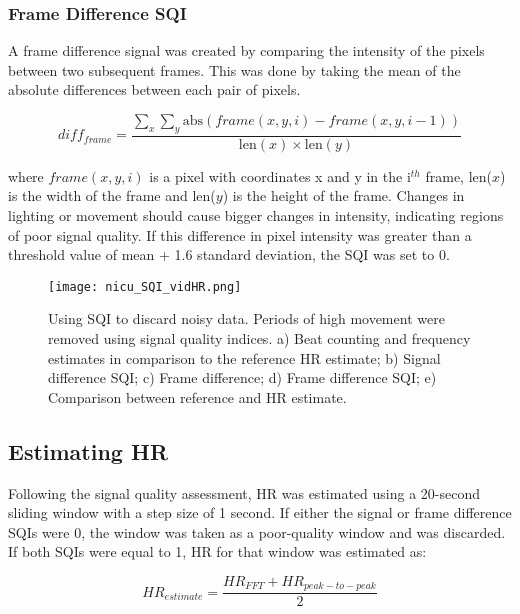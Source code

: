 \subsubsection{Frame Difference SQI}
A frame difference signal was created by comparing the intensity of the pixels between two subsequent frames. This was done by taking the mean of the absolute differences between each pair of pixels. 

\begin{equation}
	diff_{frame} =\dfrac{\sum_{x}^{}\sum_{y}^{}\textrm{abs}(frame(x,y,i) - frame(x,y,i - 1))}{\textrm{len}(x) \times \textrm{len}(y)} 
\end{equation}

where $frame(x,y,i)$ is a pixel with coordinates x and y in the i$^{th}$ frame, len($x$) is the width of the frame and len($y$) is the height of the frame. Changes in lighting or movement should cause bigger changes in intensity, indicating regions of poor signal quality. If this difference in pixel intensity was greater than a threshold value  of mean + 1.6 \times standard deviation, the SQI was set to 0.

\begin{center}
\begin{figure}[H]
    \centering
\texttt{[image: nicu\_SQI\_vidHR.png]}
    \caption[Using SQI to discard noisy data. Periods of high movement were removed using two signal quality indices.]{Using SQI to discard noisy data. Periods of high movement were removed using signal quality indices. a) Beat counting and frequency estimates in comparison to the reference HR estimate; b) Signal difference SQI; c) Frame difference; d) Frame difference SQI; e) Comparison between reference and HR estimate.}
    \label{SQI_vidHR}
\end{figure}
\end{center}

 \subsection{Estimating HR}
Following the signal quality assessment, HR was estimated using a 20-second sliding window with a step size of 1 second. If either the signal or frame difference SQIs were 0, the window was taken as a poor-quality window and was discarded. If both SQIs were equal to 1, HR for that window was estimated as:

\begin{equation}
HR_{estimate} = \frac{HR_{FFT} + HR_{peak-to-peak} }{2}	
\end{equation} 
    

